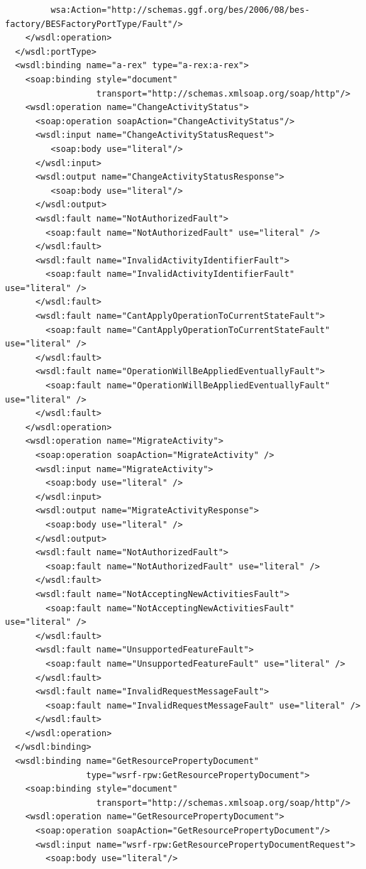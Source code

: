 \documentclass{article}                            %
\begin{document}
\begin{footnotesize}
\begin{verbatim}
         wsa:Action="http://schemas.ggf.org/bes/2006/08/bes-factory/BESFactoryPortType/Fault"/>
    </wsdl:operation>
  </wsdl:portType>
  <wsdl:binding name="a-rex" type="a-rex:a-rex">
    <soap:binding style="document"
                  transport="http://schemas.xmlsoap.org/soap/http"/>
    <wsdl:operation name="ChangeActivityStatus">
      <soap:operation soapAction="ChangeActivityStatus"/>
      <wsdl:input name="ChangeActivityStatusRequest">
         <soap:body use="literal"/>
      </wsdl:input>
      <wsdl:output name="ChangeActivityStatusResponse">
         <soap:body use="literal"/>
      </wsdl:output>
      <wsdl:fault name="NotAuthorizedFault">
        <soap:fault name="NotAuthorizedFault" use="literal" />
      </wsdl:fault>
      <wsdl:fault name="InvalidActivityIdentifierFault">
        <soap:fault name="InvalidActivityIdentifierFault" use="literal" />
      </wsdl:fault>
      <wsdl:fault name="CantApplyOperationToCurrentStateFault">
        <soap:fault name="CantApplyOperationToCurrentStateFault" use="literal" />
      </wsdl:fault>
      <wsdl:fault name="OperationWillBeAppliedEventuallyFault">
        <soap:fault name="OperationWillBeAppliedEventuallyFault" use="literal" />
      </wsdl:fault>
    </wsdl:operation>
    <wsdl:operation name="MigrateActivity">
      <soap:operation soapAction="MigrateActivity" /> 
      <wsdl:input name="MigrateActivity">
        <soap:body use="literal" />
      </wsdl:input>
      <wsdl:output name="MigrateActivityResponse">
        <soap:body use="literal" />
      </wsdl:output>
      <wsdl:fault name="NotAuthorizedFault">
        <soap:fault name="NotAuthorizedFault" use="literal" />
      </wsdl:fault>
      <wsdl:fault name="NotAcceptingNewActivitiesFault">
        <soap:fault name="NotAcceptingNewActivitiesFault" use="literal" />
      </wsdl:fault>
      <wsdl:fault name="UnsupportedFeatureFault">
        <soap:fault name="UnsupportedFeatureFault" use="literal" />
      </wsdl:fault>
      <wsdl:fault name="InvalidRequestMessageFault">
        <soap:fault name="InvalidRequestMessageFault" use="literal" />
      </wsdl:fault>
    </wsdl:operation> 
  </wsdl:binding>
  <wsdl:binding name="GetResourcePropertyDocument"
                type="wsrf-rpw:GetResourcePropertyDocument">
    <soap:binding style="document"
                  transport="http://schemas.xmlsoap.org/soap/http"/>
    <wsdl:operation name="GetResourcePropertyDocument">
      <soap:operation soapAction="GetResourcePropertyDocument"/>
      <wsdl:input name="wsrf-rpw:GetResourcePropertyDocumentRequest">
        <soap:body use="literal"/>

\end{verbatim}
\end{footnotesize}
\end{document}
